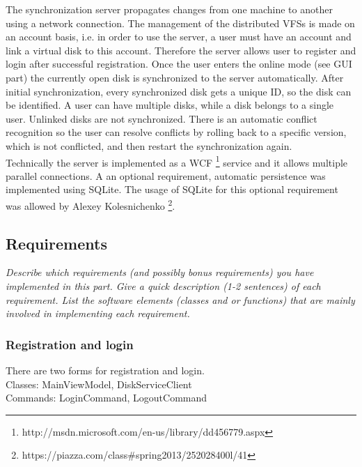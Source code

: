 \documentclass[JCDReport.tex]{subfiles}
\begin{document}
The synchronization server propagates changes from one machine to another using a network connection. The management of the distributed VFSs is made on an account basis, i.e. in order to use the server, a user must have an account and link a virtual disk to this account. Therefore the server allows user to register and login after successful registration. Once the user enters the online mode (see GUI part) the currently open disk is synchronized to the server automatically. After initial synchronization, every synchronized disk gets a unique ID, so the disk can be identified. A user can have multiple disks, while a disk belongs to a single user. Unlinked disks are not synchronized. There is an automatic conflict recognition so the user can resolve conflicts by rolling back to a specific version, which is not conflicted, and then restart the synchronization again.\\

Technically the server is implemented as a WCF \footnote{http://msdn.microsoft.com/en-us/library/dd456779.aspx} service  and it allows multiple parallel connections. A an optional requirement, automatic persistence was implemented using SQLite. The usage of SQLite for this optional requirement was allowed by Alexey Kolesnichenko \footnote{https://piazza.com/class\#spring2013/252028400l/41}.\\

\subsection{Requirements}

\emph{Describe which requirements (and possibly bonus requirements) you have implemented in this part. Give a quick description (1-2 sentences) of each requirement. List the software elements (classes and or functions) that are mainly involved in implementing each requirement.}


\subsubsection{Registration and login}
There are two forms for registration and login.\\
Classes: MainViewModel, DiskServiceClient\\
Commands: LoginCommand, LogoutCommand
\end{document}
